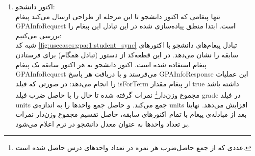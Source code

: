 \begin{enumerate}
\item اکتور دانشجو:\\
تنها پیغامی که اکتور دانشجو تا این مرحله از طراحی ارسال می‌کند پیغام GPAInfoRequest است. ابتدا منطق پیاده‌سازی شده در این تبادل این پیغام را بررسی ‌می‌کنیم:\\
 شبه کد \ref{fig:usecases:gpa:1:student_sync} تبادل پیغام‌های دانشجو با اکتور‌های سابقه را نشان می‌دهد. در این قطعه‌کد از دستور  (تبادل همگام) برای فرستادن پیغام استفاده شده است. اکتور دانشجو به هر اکتور سابقه یک پیغام GPAInfoRequest می‌فرستد و با دریافت هر پاسخ GPAInfoResponse این عملیات را انجام می‌دهد:
در صورتی که فیلد isForTerm از پیغام مقدار true داشته باشد مجموع وزن‌دار\footnote{عددی که از جمع حاصل‌ضرب هر نمره در تعداد واحدهای درس حاصل شده است.} نمرات گرفته شده تا حال را با حاصل ضرب فیلد grade در فیلد units جمع می‌کند. و حاصل جمع واحد‌ها را به اندازه‌ی units افزایش می‌دهد. نهایتا بعد از مبادله‌ی پیغام با تمام اکتور‌های سابقه، حاصل تقسیم  مجموع وزن‌دار نمرات بر تعداد واحد‌ها به عنوان معدل دانشجو در ترم اعلام می‌شود.


\end{enumerate}
